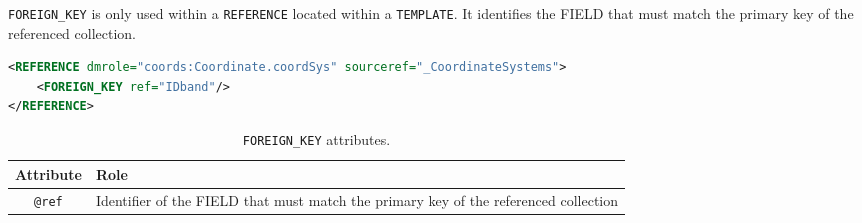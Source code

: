 \texttt{FOREIGN\_KEY} is only used within a \texttt{REFERENCE} located within a \texttt{TEMPLATE}.
It identifies the FIELD that must  match the primary key of the referenced collection.

\begin{lstlisting}[caption={The \texttt{REFERENCE} is resolved by the \texttt{INSTANCE} of the table \texttt{\_CoordinateSystems} that has a primary key equals to the value of the column  \texttt{\_band} (see line~\ref{FOREIGN_KEY_snippet} in Appendix~\ref{appendix_A}).},language=XML]
<REFERENCE dmrole="coords:Coordinate.coordSys" sourceref="_CoordinateSystems">
    <FOREIGN_KEY ref="IDband"/>
</REFERENCE>
\end{lstlisting}

\begin{table}[!htbp]
\small
\centering
\begin{tabulary}{\linewidth}{|c|J|}       
       \hline 
            \textbf{Attribute} & 
            \textbf {Role}\\
       \hline         \hline  
             \texttt{@ref} &
             Identifier of the FIELD that must  match the primary key of the referenced collection \\
     \hline
     \end{tabulary}
     \caption{\texttt{FOREIGN\_KEY} attributes.} 
     \label{tbl:foreignkey-att}
 \end{table}
